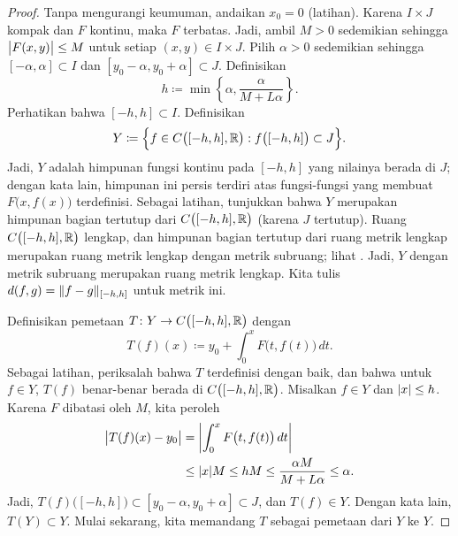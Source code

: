 \begin{proof}
Tanpa mengurangi keumuman, andaikan $x_0 =0$ (latihan).
Karena $I \times J$ kompak dan
$F$ kontinu, maka $F$ terbatas.
Jadi, ambil $M > 0$ sedemikian sehingga
$\bigl\lvert {F(x,y)} \bigr\rvert \leq M$ untuk setiap $(x,y) \in I\times J$.
Pilih $\alpha > 0$ sedemikian sehingga
$[-\alpha,\alpha] \subset I$ dan $[y_0-\alpha, y_0 + \alpha] \subset J$.
Definisikan
\begin{equation*}
h \coloneqq \min \left\{ \alpha, \frac{\alpha}{M+L\alpha} \right\} .
\end{equation*}
Perhatikan bahwa $[-h,h] \subset I$. Definisikan
\begin{equation*}
Y \coloneqq \Bigl\{ f \in C\bigl([-h,h],{\mathbb{R}}\bigr) : f\bigl([-h,h]\bigr) \subset J \Bigr\} .
\end{equation*}
Jadi, $Y$ adalah himpunan fungsi kontinu pada $[-h,h]$ yang nilainya berada di
$J$; dengan kata lain, himpunan ini persis terdiri atas
fungsi-fungsi yang membuat $F\bigl(x,f(x)\bigr)$ terdefinisi.
Sebagai latihan, tunjukkan bahwa $Y$ merupakan himpunan bagian tertutup dari $C\bigl([-h,h],{\mathbb{R}}\bigr)$
(karena $J$ tertutup).
Ruang $C\bigl([-h,h],{\mathbb{R}}\bigr)$ lengkap, dan
himpunan bagian tertutup dari ruang metrik lengkap merupakan ruang metrik lengkap dengan
metrik subruang; lihat . Jadi, $Y$ dengan
metrik subruang merupakan ruang metrik lengkap.
Kita tulis $d(f,g) = \lVert {f-g} \rVert_{[-h,h]}$ untuk metrik ini.

Definisikan pemetaan
$T \colon Y \to C\bigl([-h,h],{\mathbb{R}}\bigr)$ dengan
\begin{equation*}
T(f)(x)
\coloneqq
y_0 + \int_0^x F\bigl(t,f(t)\bigr)\,dt .
\end{equation*}
Sebagai latihan, periksalah bahwa
$T$ terdefinisi dengan baik, dan bahwa untuk $f \in Y$, $T(f)$ benar-benar berada di $C\bigl([-h,h],{\mathbb{R}}\bigr)$.
Misalkan $f \in Y$ dan $\lvert {x} \rvert \leq h$.
Karena $F$ dibatasi oleh $M$, kita peroleh
\begin{equation*}
\begin{split}
\bigl\lvert {T(f)(x) - y_0} \bigr\rvert
&= \left\lvert {\int_0^x F\bigl(t,f(t)\bigr)\,dt} \right\rvert \\
& \leq 
\lvert {x} \rvert M \leq hM \leq \frac{\alpha M}{M+ L\alpha} \leq \alpha .
\end{split}
\end{equation*}
Jadi, $T(f)\bigl([-h,h]\bigr) \subset [y_0-\alpha,y_0+\alpha] \subset J$, dan
$T(f) \in Y$. Dengan kata lain, $T(Y) \subset Y$. Mulai sekarang,
kita memandang $T$ sebagai pemetaan dari $Y$ ke $Y$.


\end{proof}
